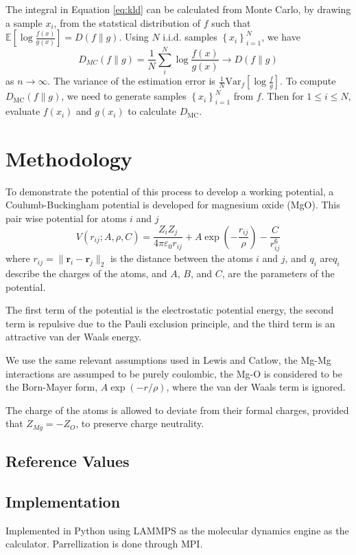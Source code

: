 The integral in Equation \ref{eq:kld} can be calculated from Monte Carlo\cite{hershey2007_kld_approx}, by drawing a sample $x_i$, from the statstical distribution of $f$ such that $\mathbb{E}\left[\log\frac{f(x)}{g(x)}\right] = D(f \parallel g)$.  Using $N$ i.i.d. samples $\left\{x_i\right\}_{i=1}^N$, we have
\begin{equation}
  \label{eq:kdmc}
  D_{MC}(f \parallel g) = \frac{1}{N}\sum_i^N \log \frac{f(x)}{g(x)}
      \rightarrow D(f \parallel g)
\end{equation}
as $n \rightarrow \infty$.  The variance of the estimation error is $\frac{1}{N}\mathrm{Var}_f\left[\log\frac{f}{g}\right]$.  To compute $D_{\mathrm{MC}}(f \parallel g)$, we need to generate samples $\left\{x_i\right\}_{i=1}^N$ from $f$.  Then for $1 \leq i \leq N$, evaluate $f(x_i)$ and $g(x_i)$ to calculate $D_{\mathrm{MC}}$.

\section{Methodology}
To demonstrate the potential of this process to develop a working potential, a Coulumb-Buckingham potential\cite{lewis1985_pot_buck_oxides} is developed for magnesium oxide (MgO).  
This pair wise potential for atoms $i$ and $j$
\begin{equation}
    \label{eq:buck_eq}
    V(r_{ij};A,\rho,C)
        = \frac{Z_i Z_j}{4 \pi \varepsilon_0 r_{ij}}
            + A \exp(-\frac{r_{ij}}{\rho})
            - \frac{C}{r_{ij}^6}
\end{equation}
where $r_{ij} = \lVert \bm{r}_i - \bm{r}_j \rVert_2$ is the distance between the atoms $i$ and $j$, and $q_i$ are$q_i$ describe the charges of the atoms, and $A$, $B$, and $C$, are the parameters of the potential.  

The first term of the potential is the electrostatic potential energy, the second term is repulsive due to the Pauli exclusion principle, and the third term is an attractive van der Waals energy.

We use the same relevant assumptions used in Lewis and Catlow\cite{lewis1985_pot_buck_oxides}, the Mg-Mg interactions are assumped to be purely coulombic, the Mg-O is considered to be the Born-Mayer form, $A \exp(-r/\rho)$, where the van der Waals term is ignored.

The charge of the atoms is allowed to deviate from their formal charges, provided that $Z_{Mg} = - Z_{O}$, to preserve charge neutrality.
\subsection{Reference Values}

\subsection{Implementation}
Implemented in Python using LAMMPS as the molecular dynamics engine as the calculator.  Parrellization is done through MPI.
